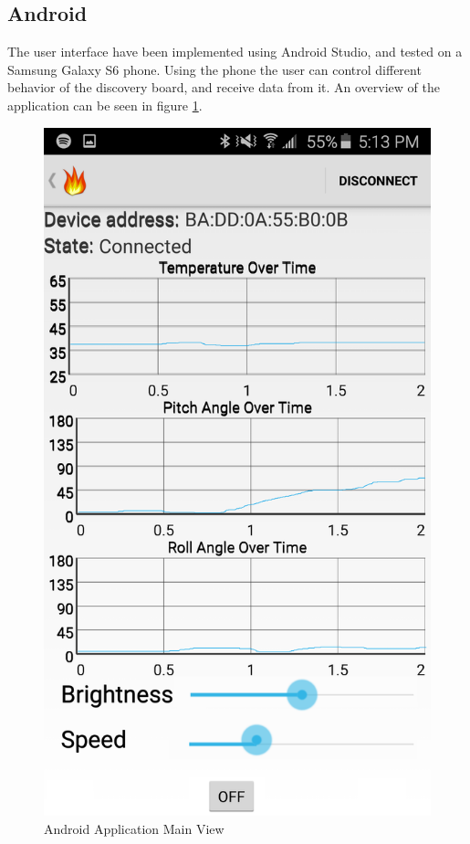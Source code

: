 \documentclass[12pt]{article}
\begin{document}
\subsection{Android}
The user interface have been implemented using Android Studio, and tested on a Samsung Galaxy S6 phone. Using the phone the user can control different behavior of the discovery board, and receive data from it. An overview of the application can be seen in figure \ref{fig:android}.

\begin{figure}[!htb]
 \centering
 \includegraphics[scale=0.15]{images/android.png}
 \caption{Android Application Main View}
 \label{fig:android}
\end{figure}
\end{document}
